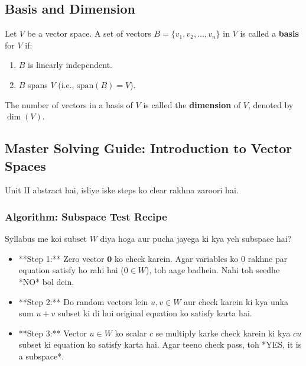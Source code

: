 \documentclass[11pt,a4paper]{article}
\begin{document}
\subsection{Basis and Dimension}

\begin{definitionbox}
Let $V$ be a vector space. A set of vectors $B = \{v_1, v_2, \dots, v_n\}$ in $V$ is called a \textbf{basis} for $V$ if:
\begin{enumerate}
    \item $B$ is linearly independent.
    \item $B$ spans $V$ (i.e., $\text{span}(B) = V$).
\end{enumerate}
The number of vectors in a basis of $V$ is called the \textbf{dimension} of $V$, denoted by $\dim(V)$.
\end{definitionbox}

\subsection{Master Solving Guide: Introduction to Vector Spaces}

Unit II abstract hai, isliye iske steps ko clear rakhna zaroori hai.

\subsubsection{Algorithm: Subspace Test Recipe}
Syllabus me koi subset $W$ diya hoga aur pucha jayega ki kya yeh subspace hai?
\begin{itemize}
    \item **Step 1:** Zero vector $\mathbf{0}$ ko check karein. Agar variables ko $0$ rakhne par equation satisfy ho rahi hai ($0 \in W$), toh aage badhein. Nahi toh seedhe *NO* bol dein.
    \item **Step 2:** Do random vectors lein $u, v \in W$ aur check karein ki kya unka sum $u+v$ subset ki di hui original equation ko satisfy karta hai.
    \item **Step 3:** Vector $u \in W$ ko scalar $c$ se multiply karke check karein ki kya $cu$ subset ki equation ko satisfy karta hai. Agar teeno check pass, toh *YES, it is a subspace*.
\end{itemize}
\end{document}
